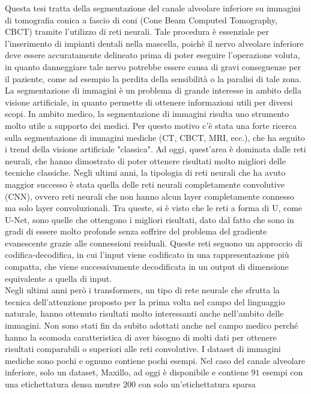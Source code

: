 \documentclass[11pt, oneside]{Thesis} %
\begin{document}
{Questa tesi tratta della segmentazione del canale alveolare inferiore su
immagini di tomografia conica a fascio di coni (Cone Beam Computed Tomography,
CBCT) tramite l'utilizzo di reti neurali. Tale procedura è essenziale per
l'inserimento di impianti dentali nella mascella, poichè il nervo alveolare
inferiore deve essere accuratamente delineato prima di poter eseguire
l'operazione voluta, in quanto danneggiare tale nervo potrebbe essere causa di
gravi conseguenze per il paziente, come ad esempio la perdita della sensibilità
o la paralisi di tale zona.\\
La segmentazione di immagini è un problema di grande interesse in ambito della
visione artificiale, in quanto permette di ottenere informazioni utili per
diversi scopi. In ambito medico, la segmentazione di immagini risulta uno
strumento molto utile a supporto dei medici. Per questo motivo c'è stata una
forte ricerca sulla segmentazione di immagini mediche (CT, CBCT, MRI, ecc.), che
ha seguito i trend della visione artificiale "classica". Ad oggi, quest'area è
dominata dalle reti neurali, che hanno dimostrato di poter ottenere risultati
molto migliori delle tecniche classiche. Negli ultimi anni, la tipologia di reti
neurali che ha avuto maggior successo è stata quella delle reti neurali
completamente convolutive (CNN), ovvero reti neurali che non hanno alcun layer
completamente connesso ma solo layer convoluzionali. Tra queste, si è visto che
le reti a forma di U, come U-Net, sono quelle che ottengono i migliori
risultati, dato dal fatto che sono in gradi di essere molto profonde senza
soffrire del problema del gradiente evanescente grazie alle connessioni
residuali. Queste reti seguono un approccio di codifica-decodifica, in cui
l'input viene codificato in una rappresentazione più compatta, che viene
successivamente decodificata in un output di dimensione equivalente a quella di
input.\\
Negli ultimi anni però i transformers, un tipo di rete neurale che sfrutta la
tecnica dell'attenzione proposto per la prima volta nel campo del linguaggio
naturale, hanno ottenuto risultati molto interessanti anche nell'ambito delle
immagini. Non sono stati fin da subito adottati anche nel campo medico perché
hanno la scomoda caratteristica di aver bisogno di molti dati per ottenere
risultati comparabili o superiori alle reti convolutive. I dataset di immagini
mediche sono pochi e ognuno contiene pochi esempi. Nel caso del canale alveolare
inferiore, solo un dataset, Maxillo, ad oggi è disponibile e contiene $91$
esempi con una etichettatura densa mentre $200$ con solo un'etichettatura sparsa
}
\end{document}
